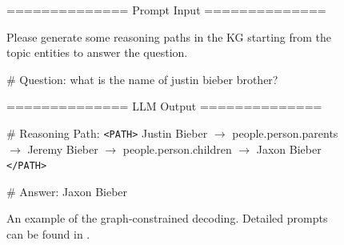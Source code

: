 \begin{figure}[]
    \centering
    \begin{minipage}{0.99\columnwidth}
        \centering
        \begin{tcolorbox}
            \scriptsize
            ============== Prompt Input ==============
    
            Please generate some reasoning paths in the KG starting from the topic entities to answer the question.
    
            \# Question: what is the name of justin bieber brother?
    
            \vspace{10pt}
            ============== LLM Output ==============
    
            \# Reasoning Path: \texttt{<PATH>} Justin Bieber $\to$ people.person.parents $\to$ Jeremy Bieber $\to$ people.person.children $\to$ Jaxon Bieber \texttt{</PATH>}
    
            \# Answer: Jaxon Bieber
        \end{tcolorbox}
        \vspace{-0.4cm}
    \end{minipage}
    \caption{An example of the graph-constrained decoding. Detailed prompts can be found in .}\label{fig:path_gen_example}
\end{figure}